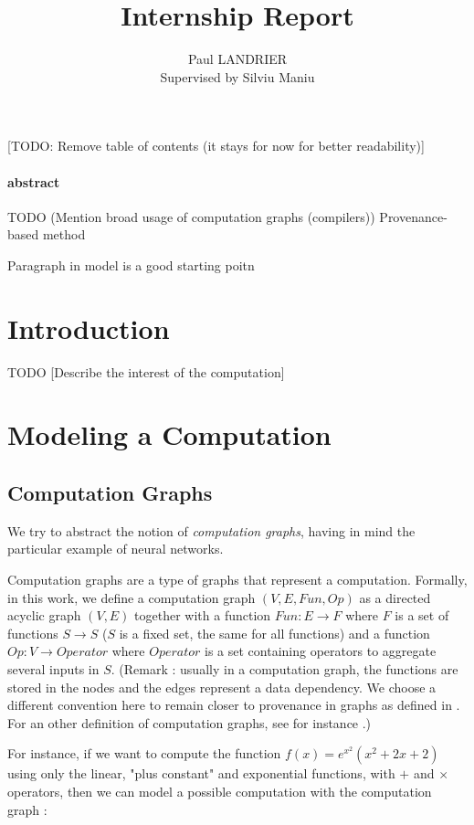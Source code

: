 \documentclass[11pt,a4paper]{article}
\author{Paul LANDRIER \\ Supervised by Silviu Maniu}
\title{Internship Report}
\date{}
\theoremstyle{definition}
\begin{document}
\maketitle

\tableofcontents

[TODO: Remove table of contents (it stays for now for better readability)]

\paragraph{abstract} TODO (Mention broad usage of computation graphs (compilers)) Provenance-based method

Paragraph in model is a good starting poitn

\section{Introduction}

TODO [Describe the interest of the computation]

\section{Modeling a Computation}

\subsection{Computation Graphs}

We try to abstract the notion of \textit{computation graphs}, having in mind the particular example of neural networks.

	Computation graphs are a type of graphs that represent a computation. Formally, in this work, we define a computation graph $(V,E,Fun,Op)$ as a directed acyclic graph $(V,E)$ together with a function $Fun:E \to F$ where $F$ is a set of functions $S \to S$ ($S$ is a fixed set, the same for all functions) and a function $Op:V \to Operator$ where $Operator$ is a set containing operators to aggregate several inputs in $S$. (Remark : usually in a computation graph, the functions are stored in the nodes and the edges represent a data dependency. We choose a different convention here to remain closer to provenance in graphs as defined in . For an other definition of computation graphs, see for instance .)
	
	For instance, if we want to compute the function $f(x)=e^{x^2}(x^2 + 2x + 2)$ using only the linear, "plus constant" and exponential functions, with $+$ and $\times$ operators, then we can model a possible computation with the computation graph :
	
\end{document}
